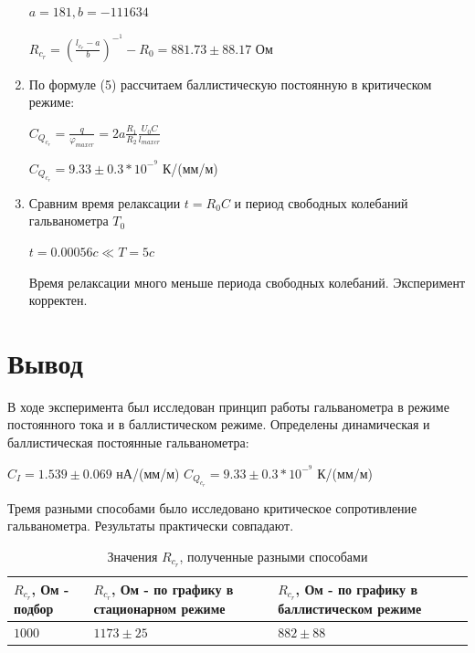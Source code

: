 \documentclass[a4paper]{article}
\begin{document}
\begin{enumerate}
\begin{center}
    $a = 181, b = -111634$ \par
    $R_c_r = (\frac{l_c_r - a}{b})^-^1 - R_0 = 881.73 \pm 88.17$ Ом
\end{center}

\item По формуле (5) рассчитаем баллистическую постоянную в критическом режиме:
\begin{center}
    $C_Q_c_r = \frac{q}{\varphi_{max cr}} = 2a\frac{R_1}{R_2} \frac{U_0 C}{l_{max cr}}$ \par
    
    $C_Q_c_r = 9.33 \pm 0.3 * 10^-^9$ К/(мм/м)
\end{center}

\item Сравним время релаксации $t = R_0 C$ и период свободных колебаний гальванометра $T_0$
\begin{center}
    $t = 0.00056 c \ll T = 5 c$
\end{center}
Время релаксации много меньше периода свободных колебаний. Эксперимент корректен.

\end{enumerate}

\section{Вывод}

В ходе эксперимента был исследован принцип работы гальванометра в режиме постоянного тока и в баллистическом режиме. Определены динамическая и баллистическая постоянные гальванометра:

\begin{center}
    $C_I = 1.539 \pm 0.069$ нА/(мм/м) \hspace{1cm} $C_Q_c_r = 9.33 \pm 0.3 * 10^-^9$ К/(мм/м)
\end{center}

Тремя разными способами было исследовано критическое сопротивление гальванометра. Результаты практически совпадают.

    \begin{table}[h]
    \centering
    \begin{center}
    \caption{Значения $R_c_r$, полученные разными способами}
    \end{center}
    \vspace{0.1cm}
    \label{tab:my_label}
    \begin{tabular}{ |p{4cm}|p{4cm}|p{4cm}|}
 \hline
    $R_c_r$, Ом - подбор & $R_c_r$, Ом  - по графику в стационарном режиме & $R_c_r$, Ом - по графику в баллистическом режиме \\
\hline
    $1000$ & $1173 \pm 25$ & $882 \pm 88$ \\
\hline
    \end{tabular}
\end{table} 
\end{document}

